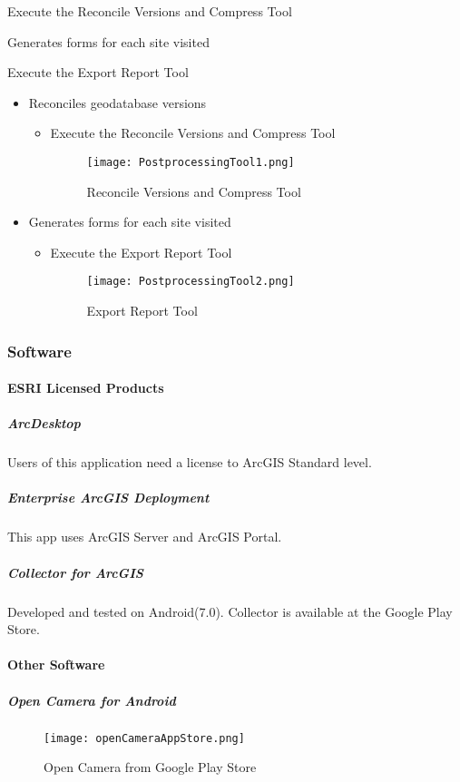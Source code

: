 Execute the Reconcile Versions and Compress Tool
\vspace{2in}

Generates forms for each site visited
\vspace{1.25in}

Execute the Export Report Tool
\clearpage
\begin{itemize}
\item Reconciles geodatabase versions
\begin{itemize}
\item Execute the Reconcile Versions and Compress Tool
\begin{figure}[h!]
\centering
    \texttt{[image: PostprocessingTool1.png]}
\caption{Reconcile Versions and Compress Tool}
\end{figure}
\end{itemize}
\item Generates forms for each site visited
\begin{itemize}
\item Execute the Export Report Tool
\begin{figure}[h!]
\centering
    \texttt{[image: PostprocessingTool2.png]}
\caption{Export Report Tool}
\end{figure}
\end{itemize}
\end{itemize}
\clearpage
\subsubsection{Software}
\paragraph{ESRI Licensed Products}
\subparagraph{ArcDesktop}Users of this application need a license to ArcGIS Standard level.
\subparagraph{Enterprise ArcGIS Deployment}This app uses ArcGIS Server and ArcGIS Portal.
\subparagraph{Collector for ArcGIS}Developed and tested on Android(7.0).  Collector is available at the Google Play Store.
\paragraph{Other Software}
\subparagraph{Open Camera for Android}
\begin{figure}[h!]
\centering
    \texttt{[image: openCameraAppStore.png]}
\caption{Open Camera from Google Play Store}
\end{figure}

